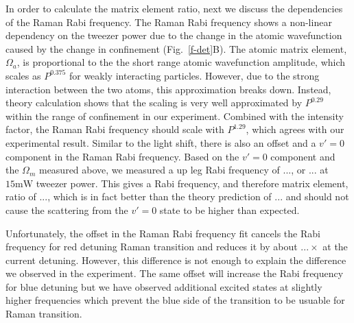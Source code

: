 \documentclass[aps,prl,twocolumn,groupedaddress]{revtex4-1}
\begin{document}
In order to calculate the matrix element ratio,
next we discuss the dependencies of the Raman Rabi frequency.
The Raman Rabi frequency shows a non-linear dependency on the tweezer power due to the change
in the atomic wavefunction caused by the change in confinement (Fig.~\ref{f-det}B).
The atomic matrix element, $\Omega_a$,
is proportional to the the short range atomic wavefunction amplitude,
which scales as $P^{0.375}$ for weakly interacting particles.
However, due to the strong interaction between the two atoms, this approximation breaks down.
Instead, theory calculation shows that the scaling is very well approximated by $P^{0.29}$
within the range of confinement in our experiment.
Combined with the intensity factor, the Raman Rabi frequency should scale with $P^{1.29}$,
which agrees with our experimental result.
Similar to the light shift, there is also an offset and
a $v'=0$ component in the Raman Rabi frequency.
Based on the $v'=0$ component and the $\Omega_m$ measured above,
we measured a up leg Rabi frequency of $...$, or $...$ at $15 \mathrm{mW}$ tweezer power.
This gives a Rabi frequency, and therefore matrix element, ratio of $...$,
which is in fact better than the theory prediction of $...$
and should not cause the scattering from the $v'=0$ state to be higher than expected.

Unfortunately, the offset in the Raman Rabi frequency fit cancels
the Rabi frequency for red detuning Raman transition and reduces it by about $...\times$
at the current detuning. However, this difference is not enough to explain
the difference we observed in the experiment.
The same offset will increase the Rabi frequency for blue detuning
but we have observed additional excited states at slightly higher frequencies
which prevent the blue side of the transition to be usuable for Raman transition.
\end{document}
